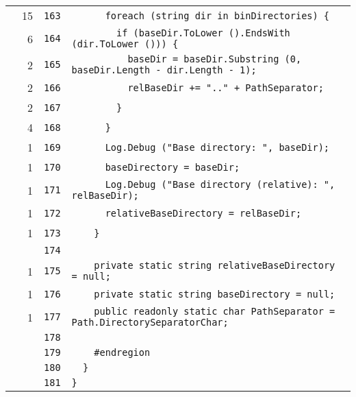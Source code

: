 \documentclass[a4paper,10pt]{article}
\begin{document}
\begin{longtable}[l]{lrrl}
\cellcolor{green} & 15 & \verb~163~ & \verb~      foreach (string dir in binDirectories) {~\\
\cellcolor{green} & 6 & \verb~164~ & \verb~        if (baseDir.ToLower ().EndsWith (dir.ToLower ())) {~\\
\cellcolor{green} & 2 & \verb~165~ & \verb~          baseDir = baseDir.Substring (0, baseDir.Length - dir.Length - 1);~\\
\cellcolor{green} & 2 & \verb~166~ & \verb~          relBaseDir += ".." + PathSeparator;~\\
\cellcolor{green} & 2 & \verb~167~ & \verb~        }~\\
\cellcolor{green} & 4 & \verb~168~ & \verb~      }~\\
\cellcolor{green} & 1 & \verb~169~ & \verb~      Log.Debug ("Base directory: ", baseDir);~\\
\cellcolor{green} & 1 & \verb~170~ & \verb~      baseDirectory = baseDir;~\\
\cellcolor{green} & 1 & \verb~171~ & \verb~      Log.Debug ("Base directory (relative): ", relBaseDir);~\\
\cellcolor{green} & 1 & \verb~172~ & \verb~      relativeBaseDirectory = relBaseDir;~\\
\cellcolor{green} & 1 & \verb~173~ & \verb~    }~\\
\cellcolor{gray} &  & \verb~174~ & \verb~~\\
\cellcolor{green} & 1 & \verb~175~ & \verb~    private static string relativeBaseDirectory = null;~\\
\cellcolor{green} & 1 & \verb~176~ & \verb~    private static string baseDirectory = null;~\\
\cellcolor{green} & 1 & \verb~177~ & \verb~    public readonly static char PathSeparator = Path.DirectorySeparatorChar;~\\
\cellcolor{gray} &  & \verb~178~ & \verb~~\\
\cellcolor{gray} &  & \verb~179~ & \verb~    #endregion~\\
\cellcolor{gray} &  & \verb~180~ & \verb~  }~\\
\cellcolor{gray} &  & \verb~181~ & \verb~}~\\
\end{longtable}
\end{document}
